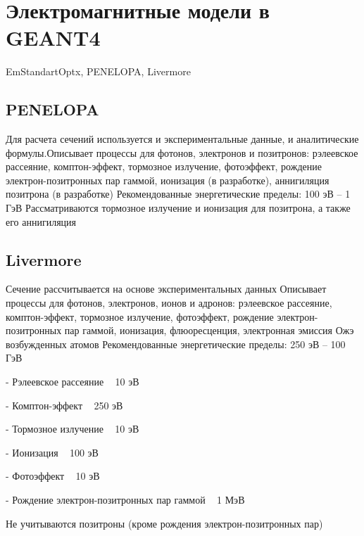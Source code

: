   

\section{Электромагнитные модели в GEANT4 }\label{sec:theory/models}

EmStandartOptx, PENELOPA, Livermore

\subsection{PENELOPA}
Для расчета сечений используется и экспериментальные данные, и аналитические формулы.Описывает процессы для фотонов, электронов и позитронов: рэлеевское рассеяние, комптон-эффект, тормозное излучение, фотоэффект, рождение электрон-позитронных пар гаммой, ионизация (в разработке), аннигиляция позитрона (в разработке)
Рекомендованные энергетические пределы: 100 эВ – 1 ГэВ
Рассматриваются тормозное излучение и ионизация для позитрона, а также его аннигиляция

\subsection{Livermore}
Сечение рассчитывается на основе экспериментальных данных
Описывает процессы для фотонов, электронов, ионов и адронов: рэлеевское рассеяние, комптон-эффект, тормозное излучение, фотоэффект, рождение электрон-позитронных пар гаммой, ионизация, флюоресценция, электронная эмиссия Ожэ возбужденных атомов
Рекомендованные энергетические пределы: 250 эВ – 100 ГэВ

- Рэлеевское рассеяние ~ 10 эВ

- Комптон-эффект ~ 250 эВ

- Тормозное излучение ~ 10 эВ

- Ионизация ~ 100 эВ

- Фотоэффект ~ 10 эВ

- Рождение электрон-позитронных пар гаммой ~ 1 МэВ

Не учитываются позитроны (кроме рождения электрон-позитронных пар)

\subsection{}
